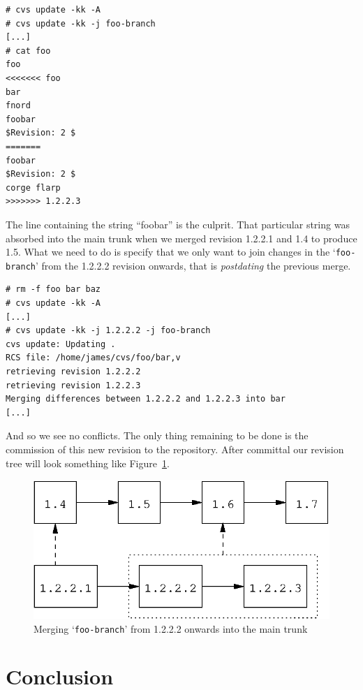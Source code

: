 \documentclass[12pt,letterpaper]{article}
\newcommand{\cmd}[1]{`\texttt{#1}'}
\begin{document}
\begin{Verbatim}
# cvs update -kk -A
# cvs update -kk -j foo-branch
[...]
# cat foo
foo
<<<<<<< foo
bar
fnord
foobar
$Revision: 2 $
=======
foobar
$Revision: 2 $
corge flarp
>>>>>>> 1.2.2.3
\end{Verbatim}

The line containing the string ``foobar'' is the culprit.  That particular
string was absorbed into the main trunk when we merged revision 1.2.2.1 and
1.4 to produce 1.5.  What we need to do is specify that we only want to join
changes in the \cmd{foo-branch} from the 1.2.2.2 revision onwards, that is
\emph{postdating} the previous merge.

\begin{Verbatim}
# rm -f foo bar baz
# cvs update -kk -A
[...]
# cvs update -kk -j 1.2.2.2 -j foo-branch
cvs update: Updating .
RCS file: /home/james/cvs/foo/bar,v
retrieving revision 1.2.2.2
retrieving revision 1.2.2.3
Merging differences between 1.2.2.2 and 1.2.2.3 into bar
[...]
\end{Verbatim}

And so we see no conflicts.  The only thing remaining to be done is the
commission of this new revision to the repository.  After committal our
revision tree will look something like Figure~\ref{fig:walkthru-mulbmerge2}.

\begin{figure}[htb]
\begin{center}
\includegraphics{walkthru-mulbmerge2.eps}
\end{center}
\caption{Merging \cmd{foo-branch} from 1.2.2.2 onwards into the main trunk}
\label{fig:walkthru-mulbmerge2}
\end{figure}



\section{Conclusion}
\end{document}
